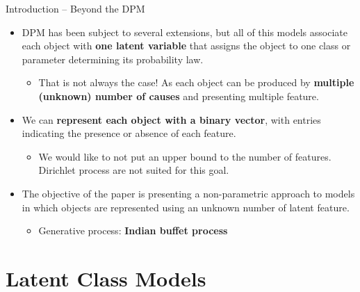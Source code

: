 \documentclass[aspectratio=169,xcolor=dvipsnames]{beamer}
\begin{document}
\begin{frame}{Introduction – Beyond the DPM}
\setlength{\leftmargini}{0.2cm}
\begin{itemize}[<+->]
    \item DPM has been subject to several extensions, but all of this models associate each object with \textbf{one latent variable} that assigns the object to one class or parameter determining its probability law.
    \begin{itemize}[<+->]
        \item That is not always the case! As each object can be produced by \textbf{multiple (unknown) number of causes} and presenting multiple feature.
    \end{itemize}
    \item We can \textbf{represent each object with a binary vector}, with entries indicating the presence or absence of each feature.
    \begin{itemize}[<+->]
        \item We would like to not put an upper bound to the number of features. Dirichlet process are not suited for this goal.
    \end{itemize}
    \item The objective of the paper is presenting a non-parametric approach to models in which objects are represented using an unknown number of latent feature.
    \begin{itemize}[<+->]
        \item Generative process: \textbf{Indian buffet process}
    \end{itemize}
\end{itemize}
\end{frame}

\section{Latent Class Models} 
\end{document}
